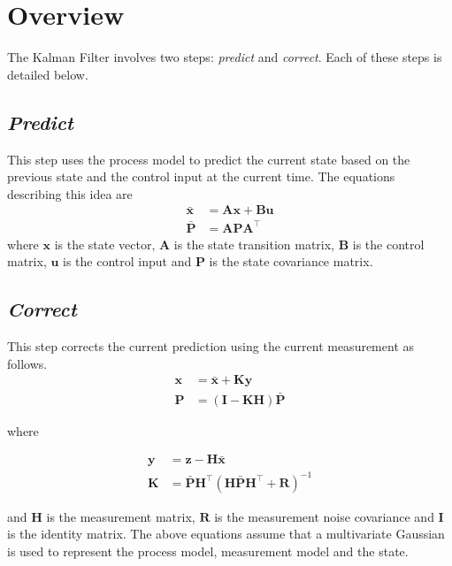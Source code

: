 \documentclass[10pt, a4paper]{article}
\begin{document}
\todaydate{}

\section*{Overview}
The Kalman Filter involves two steps: \textit{predict} and \textit{correct}. Each of these steps is detailed below.

\subsection*{\textit{Predict}}
This step uses the process model to predict the current state based on the previous state and the control input at the current time.
The equations describing this idea are
\begin{align}
  \bar{\mathbf{x}} &= \mathbf{Ax} + \mathbf{Bu} \\
  \bar{\mathbf{P}} &= \mathbf{APA}^\top
\end{align}
where $\mathbf{x}$ is the state vector, $\mathbf{A}$ is the state transition matrix, $\mathbf{B}$ is the control matrix, $\mathbf{u}$ is the control input and $\mathbf{P}$ is the state covariance matrix.

\subsection*{\textit{Correct}}
This step corrects the current prediction using the current measurement as follows.
\begin{align}
  \mathbf{x} &= \bar{\mathbf{x}} + \mathbf{Ky} \\
  \mathbf{P} &= (\mathbf{I} - \mathbf{KH})\bar{\mathbf{P}}
\end{align}

where

\begin{align*}
  \mathbf{y} &= \mathbf{z} - \mathbf{H}\bar{\mathbf{x}} \\
  \mathbf{K} &= \bar{\mathbf{P}}\mathbf{H}^\top (\mathbf{H}\bar{\mathbf{P}}\mathbf{H}^\top + \mathbf{R})^{-1}
\end{align*}

and $\mathbf{H}$ is the measurement matrix, $\mathbf{R}$ is the measurement noise covariance and $\mathbf{I}$ is the identity matrix.
The above equations assume that a multivariate Gaussian is used to represent the process model, measurement model and the state.
\end{document}
